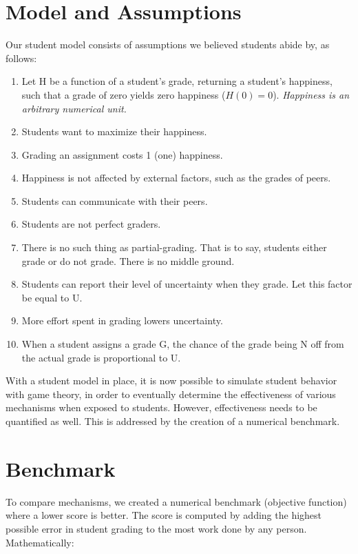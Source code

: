 \documentclass{sigchi}
\begin{document}
\section{Model and Assumptions}
\label{sec:modelandassumptions}
Our student model consists of assumptions we believed students abide by, as follows:
\begin{enumerate}
  \item Let H be a function of a student's grade, returning a student's happiness, such that a grade of zero yields zero happiness ($H(0)=0$). \newline \textit{Happiness is an arbitrary numerical unit.}
  \item Students want to maximize their happiness.
  \item Grading an assignment costs 1 (one) happiness.
  \item Happiness is not affected by external factors, such as the grades of peers.
  \item Students can communicate with their peers.
  \item Students are not perfect graders.
  \item There is no such thing as partial-grading. That is to say, students either grade or do not grade. There is no middle ground.
  \item Students can report their level of uncertainty when they grade. Let this factor be equal to U.
  \item More effort spent in grading lowers uncertainty.
  \item When a student assigns a grade G, the chance of the grade being N off from the actual grade is proportional to U.
\end{enumerate}

With a student model in place, it is now possible to simulate student behavior with game theory, in order to eventually determine the effectiveness of various mechanisms when exposed to students. However, effectiveness needs to be quantified as well. This is addressed by the creation of a numerical benchmark.

\section{Benchmark}

To compare mechanisms, we created a numerical benchmark (objective function) where a lower score is better. The score is computed by adding the highest possible error in student grading to the most work done by any person. Mathematically:
\end{document}
